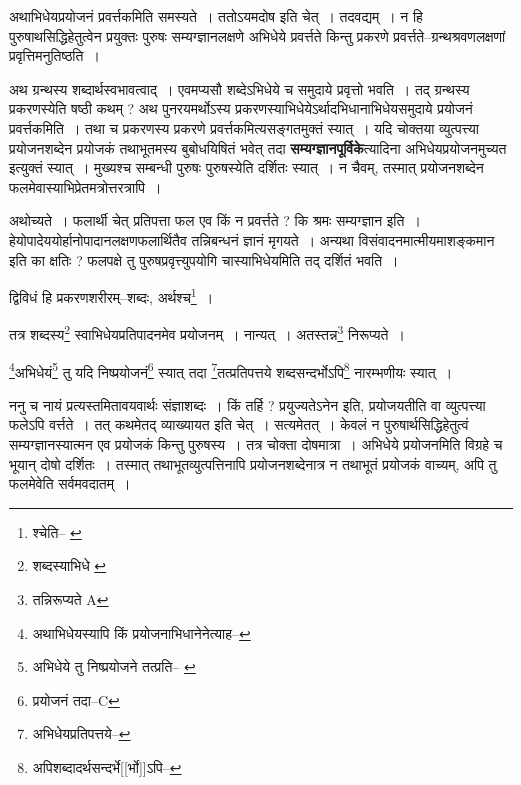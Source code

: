 \documentclass[article,12pt,a4paper]{memoir}
\begin{document}
	  \pstart अथाभिधेयप्रयोजनं प्रवर्त्तकमिति समस्यते । ततोऽयमदोष इति चेत् । तदवद्यम् । न हि पुरुषाथसिद्धिहेतुत्वेन प्रयुक्तः पुरुषः सम्यग्ज्ञानलक्षणे अभिधेये प्रवर्त्तते किन्तु प्रकरणे प्रवर्त्तते--ग्रन्थश्रवणलक्षणां प्रवृत्तिमनुतिष्ठति ।
	\pend
      

	  \pstart अथ ग्रन्थस्य शब्दार्थस्वभावत्वाद् । एवमप्यसौ शब्देऽभिधेये च समुदाये प्रवृत्तो भवति । तद् ग्रन्थस्य प्रकरणस्येति षष्ठी कथम् ? अथ पुनरयमर्थोऽस्य प्रकरणस्याभिधेयेऽर्थादभिधानाभिधेयसमुदाये प्रयोजनं प्रवर्त्तकमिति । तथा च प्रकरणस्य प्रकरणे प्रवर्त्तकमित्यसङ्गतमुक्तं स्यात् । यदि चोक्तया व्युत्पत्त्या प्रयोजनशब्देन प्रयोजकं तथाभूतमस्य बुबोधयिषितं भवेत् तदा \textbf{सम्यग्ज्ञानपूर्विके}त्यादिना अभिधेयप्रयोजनमुच्यत इत्युक्तं स्यात् । मुख्यश्च सम्बन्धी पुरुषः पुरुषस्येति दर्शितः स्यात् । न चैवम्, तस्मात् प्रयोजनशब्देन फलमेवास्याभिप्रेतमत्रोत्तरत्रापि ।
	\pend
      

	  \pstart अथोच्यते । फलार्थी चेत् प्रतिपत्ता फल एव किं न प्रवर्त्तते ? कि श्रमः सम्यग्ज्ञान इति । हेयोपादेययोर्हानोपादानलक्षणफलार्थितैव तन्निबन्धनं ज्ञानं मृगयते । अन्यथा विसंवादनमात्मीयमाशङ्कमान इति का क्षतिः ? फलपक्षे तु पुरुषप्रवृत्त्युपयोगि चास्याभिधेयमिति तद् दर्शितं भवति ।
	\pend
	  \bigskip
	  \begingroup
	

	  \pstart द्विविधं हि प्रकरणशरीरम्--शब्दः, अर्थश्च\footnote{श्चेति--\cite{dp-edE} \cite{dp-edH} \cite{dp-edN} \cite{dp-edP}} ।
	\pend
       

	  \pstart तत्र शब्दस्य\footnote{शब्दस्याभिधे \cite{dp-msB} \cite{dp-msC} \cite{dp-msD}} स्वाभिधेयप्रतिपादनमेव प्रयोजनम् । नान्यत् । अतस्तन्न\footnote{तन्निरूप्यते A} निरूप्यते ।
	\pend
       

	  \pstart \footnote{अथाभिधेयस्यापि किं प्रयोजनाभिधानेनेत्याह--\cite{dp-msD-n}}\-अभिधेयं\footnote{अभिधेये तु निष्प्रयोजने तत्प्रति--\cite{dp-msB} \cite{dp-msD}} तु यदि निष्प्रयोजनं\footnote{प्रयोजनं तदा--C} स्यात् तदा \footnote{अभिधेयप्रतिपत्तये--\cite{dp-msD-n}}\-तत्प्रतिपत्तये शब्दसन्दर्भोऽपि\footnote{अपिशब्दादर्थसन्दर्भे[[र्भो]]ऽपि--\cite{dp-msD-n}} नारम्भणीयः स्यात् ।
	\pend
      
	  \endgroup
	

	  \pstart ननु च नायं प्रत्यस्तमितावयवार्थः संज्ञाशब्दः । किं तर्हि ? प्रयुज्यतेऽनेन इति, प्रयोजयतीति वा व्युत्पत्त्या फलेऽपि वर्त्तते । तत् कथमेतद् व्याख्यायत इति चेत् । सत्यमेतत् । केवलं न पुरुषार्थसिद्धिहेतुत्वं सम्यग्ज्ञानस्यात्मन एव प्रयोजकं किन्तु पुरुषस्य । तत्र चोक्ता दोषमात्रा । अभिधेये प्रयोजनमिति विग्रहे च भूयान् दोषो दर्शितः । तस्मात् तथाभूतव्युत्पत्तिनापि प्रयोजनशब्देनात्र न तथाभूतं प्रयोजकं वाच्यम्, अपि तु फलमेवेति सर्वमवदातम् ।
	\pend
      
\end{document}
